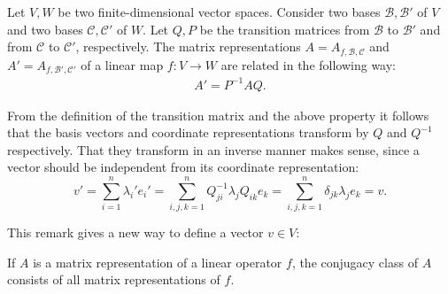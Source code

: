     \begin{result}\label{linalgebra:transition_matrix_representation}
        Let $V,W$ be two finite-dimensional vector spaces. Consider two bases $\mathcal{B},\mathcal{B}'$ of $V$ and two bases $\mathcal{C},\mathcal{C}'$ of $W$. Let $Q,P$ be the transition matrices from $\mathcal{B}$ to $\mathcal{B}'$ and from $\mathcal{C}$ to $\mathcal{C}'$, respectively. The matrix representations $A=A_{f,\mathcal{B},\mathcal{C}}$ and $A' = A_{f,\mathcal{B}',\mathcal{C}'}$ of a linear map $f:V\rightarrow W$ are related in the following way:
        \begin{gather}
            A' = P^{-1}AQ.
        \end{gather}
    \end{result}

    \begin{remark}
        From the definition of the transition matrix and the above property it follows that the basis vectors and coordinate representations transform by $Q$ and $Q^{-1}$ respectively. That they transform in an inverse manner makes sense, since a vector should be independent from its coordinate representation: \[v'=\sum_{i=1}^n\lambda_i'e_i'=\sum_{i,j,k=1}^nQ^{-1}_{ji}\lambda_jQ_{ik}e_k = \sum_{i,j,k=1}^n\delta_{jk}\lambda_je_k = v.\]
    \end{remark}
    This remark gives a new way to define a vector $v\in V$:

    \begin{remark}
        If $A$ is a matrix representation of a linear operator $f$, the conjugacy class of $A$ consists of all matrix representations of $f$.
    \end{remark}

